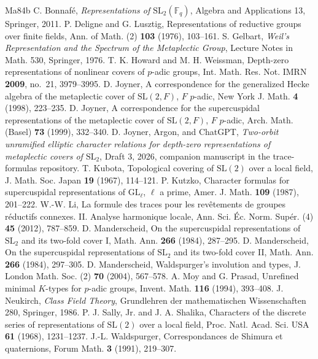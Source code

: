\documentclass[12pt,letterpaper]{article}
\numberwithin{equation}{section}
\theoremstyle{definition}
\theoremstyle{remark}
\begin{document}
\begin{thebibliography}{Ma84b}
 C. Bonnaf\'e, \emph{Representations of $\mathrm{SL}_2(\mathbb F_q)$}, Algebra and Applications 13, Springer, 2011.
 P. Deligne and G. Lusztig, Representations of reductive groups over finite fields, Ann. of Math. (2) \textbf{103} (1976), 103--161.
 S. Gelbart, \emph{Weil's Representation and the Spectrum of the Metaplectic Group}, Lecture Notes in Math. 530, Springer, 1976.
 T. K. Howard and M. H. Weissman, Depth-zero representations of nonlinear covers of $p$-adic groups, Int. Math. Res. Not. IMRN \textbf{2009}, no.~21, 3979--3995.
 D. Joyner, A correspondence for the generalized Hecke algebra of the metaplectic cover of $\mathrm{SL}(2,F)$, $F$ $p$-adic, New York J. Math. \textbf{4} (1998), 223--235.
 D. Joyner, A correspondence for the supercuspidal representations of the metaplectic cover of $\mathrm{SL}(2,F)$, $F$ $p$-adic, Arch. Math. (Basel) \textbf{73} (1999), 332--340.
 D. Joyner, Argon, and ChatGPT, \emph{Two-orbit unramified elliptic character relations for depth-zero representations of metaplectic covers of $\mathrm{SL}_2$}, Draft 3, 2026, companion manuscript in the trace-formulas repository.
 T. Kubota, Topological covering of $\mathrm{SL}(2)$ over a local field, J. Math. Soc. Japan \textbf{19} (1967), 114--121.
 P. Kutzko, Character formulas for supercuspidal representations of $\mathrm{GL}_\ell$, $\ell$ a prime, Amer. J. Math. \textbf{109} (1987), 201--222.
 W.-W. Li, La formule des traces pour les rev\^etements de groupes r\'eductifs connexes. II. Analyse harmonique locale, Ann. Sci. \'Ec. Norm. Sup\'er. (4) \textbf{45} (2012), 787--859.
 D. Manderscheid, On the supercuspidal representations of $\mathrm{SL}_2$ and its two-fold cover I, Math. Ann. \textbf{266} (1984), 287--295.
 D. Manderscheid, On the supercuspidal representations of $\mathrm{SL}_2$ and its two-fold cover II, Math. Ann. \textbf{266} (1984), 297--305.
 D. Manderscheid, Waldspurger's involution and types, J. London Math. Soc. (2) \textbf{70} (2004), 567--578.
 A. Moy and G. Prasad, Unrefined minimal $K$-types for $p$-adic groups, Invent. Math. \textbf{116} (1994), 393--408.
 J. Neukirch, \emph{Class Field Theory}, Grundlehren der mathematischen Wissenschaften 280, Springer, 1986.
 P. J. Sally, Jr. and J. A. Shalika, Characters of the discrete series of representations of $\mathrm{SL}(2)$ over a local field, Proc. Natl. Acad. Sci. USA \textbf{61} (1968), 1231--1237.
 J.-L. Waldspurger, Correspondances de Shimura et quaternions, Forum Math. \textbf{3} (1991), 219--307.
\end{thebibliography}
\end{document}
